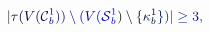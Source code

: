 \documentclass[12pt]{article}
\begin{document}
\makeatletter
\renewcommand*{\@textcolor}[3]{%
  \protect\leavevmode
  \begingroup
    \color#1{#2}#3%
  \endgroup
}
\makeatother
\begin{displaymath}
\mathcolor[RGB]{0,0,15}{|} \mathcolor[RGB]{0,0,30}{\tau} \mathcolor[RGB]{0,0,45}{(} \mathcolor[RGB]{0,0,60}{V} \mathcolor[RGB]{0,0,75}{(} \mathcal { \mathcolor[RGB]{0,0,90}{C} } _ { \mathcolor[RGB]{0,0,105}{b} } ^ { \mathcolor[RGB]{0,0,120}{1} } \mathcolor[RGB]{0,0,135}{)} \mathcolor[RGB]{0,0,150}{)} \mathcolor[RGB]{0,0,165}{\setminus} \mathcolor[RGB]{0,0,180}{(} \mathcolor[RGB]{0,0,195}{V} \mathcolor[RGB]{0,0,210}{(} \mathcal { \mathcolor[RGB]{0,0,225}{S} } _ { \mathcolor[RGB]{0,0,240}{b} } ^ { \mathcolor[RGB]{0,0,255}{1} } \mathcolor[RGB]{0,15,0}{)} \mathcolor[RGB]{0,15,15}{\setminus} \mathcolor[RGB]{0,15,30}{\{} \mathcolor[RGB]{0,15,45}{\kappa} _ { \mathcolor[RGB]{0,15,60}{b} } ^ { \mathcolor[RGB]{0,15,75}{1} } \mathcolor[RGB]{0,15,90}{\}} \mathcolor[RGB]{0,15,105}{)} \mathcolor[RGB]{0,15,120}{|} \mathcolor[RGB]{0,15,135}{\geq} \mathcolor[RGB]{0,15,150}{3} \mathcolor[RGB]{0,15,165}{,}
\end{displaymath}
\end{document}
